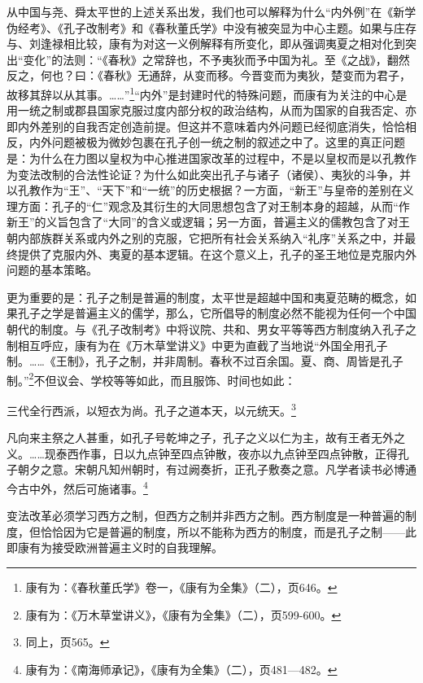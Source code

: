 \documentclass[a4paper, 12pt, openright]{ctexbook}
\renewenvironment{quote}
  {\list{}{\rightmargin2\ccwd \leftmargin2\ccwd \itemindent=2\ccwd \listparindent=2\ccwd}%
   \item\relax\small\kaishu\color{black}}
  {\endlist}
\begin{document}
从中国与尧、舜太平世的上述关系出发，我们也可以解释为什么“内外例”在《新学伪经考》、《孔子改制考》和《春秋董氏学》中没有被突显为中心主题。如果与庄存与、刘逢禄相比较，康有为对这一义例解释有所变化，即从强调夷夏之相对化到突出“变化”的法则：“《春秋》之常辞也，不予夷狄而予中国为礼。至《之战》，翻然反之，何也？曰：《春秋》无通辞，从变而移。今晋变而为夷狄，楚变而为君子，故移其辞以从其事。……”\footnote{康有为：《春秋董氏学》卷一，《康有为全集》（二），页646。}“内外”是封建时代的特殊问题，而康有为关注的中心是用一统之制或郡县国家克服过度内部分权的政治结构，从而为国家的自我否定、亦即内外差别的自我否定创造前提。但这并不意味着内外问题已经彻底消失，恰恰相反，内外问题被极为微妙包裹在孔子创一统之制的叙述之中了。这里的真正问题是：为什么在力图以皇权为中心推进国家改革的过程中，不是以皇权而是以孔教作为变法改制的合法性论证？为什么如此突出孔子与诸子（诸侯）、夷狄的斗争，并以孔教作为“王”、“天下”和“一统”的历史根据？一方面，“新王”与皇帝的差别在义理方面：孔子的“仁”观念及其衍生的大同思想包含了对王制本身的超越，从而“作新王”的义旨包含了“大同”的含义或逻辑；另一方面，普遍主义的儒教包含了对王朝内部族群关系或内外之别的克服，它把所有社会关系纳入“礼序”关系之中，并最终提供了克服内外、夷夏的基本逻辑。在这个意义上，孔子的圣王地位是克服内外问题的基本策略。

更为重要的是：孔子之制是普遍的制度，太平世是超越中国和夷夏范畴的概念，如果孔子之学是普遍主义的儒学，那么，它所倡导的制度必然不能视为任何一个中国朝代的制度。与《孔子改制考》中将议院、共和、男女平等等西方制度纳入孔子之制相互呼应，康有为在《万木草堂讲义》中更为直截了当地说“外国全用孔子制。……《王制》，孔子之制，并非周制。春秋不过百余国。夏、商、周皆是孔子制。”\footnote{康有为：《万木草堂讲义》，《康有为全集》（二），页599-600。}不但议会、学校等等如此，而且服饰、时间也如此：

\begin{quote}
三代全行西派，以短衣为尚。孔子之道本天，以元统天。\footnote{同上，页565。}
\end{quote}

\begin{quote}
凡向来主祭之人甚重，如孔子号乾坤之子，孔子之义以仁为主，故有王者无外之义。……现泰西作事，日以九点钟至四点钟散，夜亦以九点钟至四点钟散，正得孔子朝夕之意。宋朝凡知州朝时，有过阙奏折，正孔子敷奏之意。凡学者读书必博通今古中外，然后可施诸事。\footnote{康有为：《南海师承记》，《康有为全集》（二），页481—482。}
\end{quote}

变法改革必须学习西方之制，但西方之制并非西方之制。西方制度是一种普遍的制度，但恰恰因为它是普遍的制度，所以不能称为西方的制度，而是孔子之制——此即康有为接受欧洲普遍主义时的自我理解。
\end{document}
